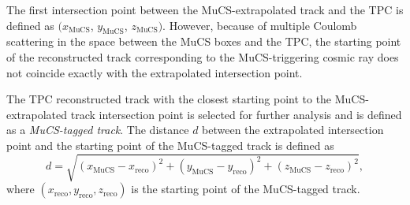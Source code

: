 \documentclass[a4paper,11pt]{article}
\begin{document}
The first intersection point between the MuCS-extrapolated track and the TPC is defined as $(x_{\mathrm{MuCS}}$, $y_{\mathrm{MuCS}}$, $z_{\mathrm{MuCS}})$. However, because of multiple Coulomb scattering in the space between the MuCS boxes and the TPC, the starting point of the reconstructed track corresponding to the MuCS-triggering cosmic ray does not coincide exactly with the extrapolated intersection point.

The TPC reconstructed track with the closest starting point to the MuCS-extrapolated track intersection point is selected for further analysis and is defined as a \emph{MuCS-tagged track}.
The distance $d$ between the extrapolated intersection point and the starting point of the MuCS-tagged track is defined as
\begin{equation}\label{eq:d}
d = \sqrt{(x_{\mathrm{MuCS}}-x_{\mathrm{reco}})^2+(y_{\mathrm{MuCS}}-y_{\mathrm{reco}})^2+(z_{\mathrm{MuCS}}-z_{\mathrm{reco}})^2},
\end{equation}
where $(x_{\mathrm{reco}},y_{\mathrm{reco}},z_{\mathrm{reco}})$ is the starting point of the MuCS-tagged track.
\end{document}
